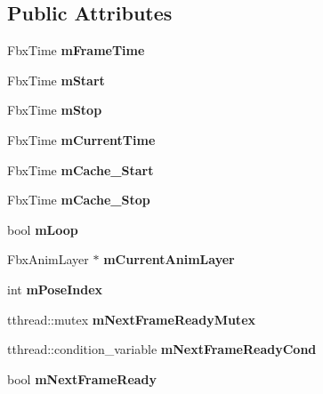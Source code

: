 \subsection*{Public Attributes}
\begin{DoxyCompactItemize}
\item 
\hypertarget{class_fbx_model_a8e41cabb48a665daa09efffca33e9a61}{Fbx\-Time {\bfseries m\-Frame\-Time}}\label{class_fbx_model_a8e41cabb48a665daa09efffca33e9a61}

\item 
\hypertarget{class_fbx_model_a3779a8813da990cbb4a4cfccb8ab9d73}{Fbx\-Time {\bfseries m\-Start}}\label{class_fbx_model_a3779a8813da990cbb4a4cfccb8ab9d73}

\item 
\hypertarget{class_fbx_model_abb3fa1c071403455f870764fef33f08f}{Fbx\-Time {\bfseries m\-Stop}}\label{class_fbx_model_abb3fa1c071403455f870764fef33f08f}

\item 
\hypertarget{class_fbx_model_a883ddae7b818a65a318c227db224347a}{Fbx\-Time {\bfseries m\-Current\-Time}}\label{class_fbx_model_a883ddae7b818a65a318c227db224347a}

\item 
\hypertarget{class_fbx_model_a17000fb48a517ed97c456ade83c7fd02}{Fbx\-Time {\bfseries m\-Cache\-\_\-\-Start}}\label{class_fbx_model_a17000fb48a517ed97c456ade83c7fd02}

\item 
\hypertarget{class_fbx_model_ae912dcb0197b4e3bc2ad06e403732a54}{Fbx\-Time {\bfseries m\-Cache\-\_\-\-Stop}}\label{class_fbx_model_ae912dcb0197b4e3bc2ad06e403732a54}

\item 
\hypertarget{class_fbx_model_a43e9f2b8ca30d6876fd51a86d91a567f}{bool {\bfseries m\-Loop}}\label{class_fbx_model_a43e9f2b8ca30d6876fd51a86d91a567f}

\item 
\hypertarget{class_fbx_model_a9c974eba7806261eff002906a70edd90}{Fbx\-Anim\-Layer $\ast$ {\bfseries m\-Current\-Anim\-Layer}}\label{class_fbx_model_a9c974eba7806261eff002906a70edd90}

\item 
\hypertarget{class_fbx_model_aaf4493093038baf5031a6148848f622e}{int {\bfseries m\-Pose\-Index}}\label{class_fbx_model_aaf4493093038baf5031a6148848f622e}

\item 
\hypertarget{class_fbx_model_a37621a3a729fb1555c5ab75f3bac0549}{tthread\-::mutex {\bfseries m\-Next\-Frame\-Ready\-Mutex}}\label{class_fbx_model_a37621a3a729fb1555c5ab75f3bac0549}

\item 
\hypertarget{class_fbx_model_a2eaeed87ceba4d683f92bd969c05fd07}{tthread\-::condition\-\_\-variable {\bfseries m\-Next\-Frame\-Ready\-Cond}}\label{class_fbx_model_a2eaeed87ceba4d683f92bd969c05fd07}

\item 
\hypertarget{class_fbx_model_a677a0e4b4629499c817856d7c5ba35b5}{bool {\bfseries m\-Next\-Frame\-Ready}}\label{class_fbx_model_a677a0e4b4629499c817856d7c5ba35b5}

\end{DoxyCompactItemize}
